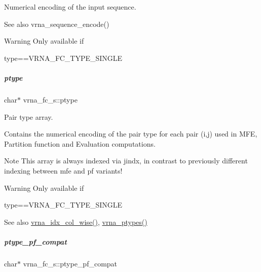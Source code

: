 Numerical encoding of the input sequence. 

\begin{DoxySeeAlso}{See also}
vrna\+\_\+sequence\+\_\+encode() 
\end{DoxySeeAlso}
\begin{DoxyWarning}{Warning}
Only available if\begin{DoxyVerb}type==VRNA_FC_TYPE_SINGLE \end{DoxyVerb}
 
\end{DoxyWarning}
\mbox{\label{group__fold__compound_a3fbea559f1d1976b2d67c215cdeee0b2}} 
\subparagraph{\texorpdfstring{ptype}{ptype}}
{\footnotesize\ttfamily char$\ast$ vrna\+\_\+fc\+\_\+s\+::ptype}



Pair type array. 

Contains the numerical encoding of the pair type for each pair (i,j) used in M\+FE, Partition function and Evaluation computations. \begin{DoxyNote}{Note}
This array is always indexed via jindx, in contrast to previously different indexing between mfe and pf variants! 
\end{DoxyNote}
\begin{DoxyWarning}{Warning}
Only available if\begin{DoxyVerb}type==VRNA_FC_TYPE_SINGLE \end{DoxyVerb}
 
\end{DoxyWarning}
\begin{DoxySeeAlso}{See also}
\hyperlink{group__utils_ga89ebc69c52fa0c78c9e1974b0017746b}{vrna\+\_\+idx\+\_\+col\+\_\+wise()}, \hyperlink{group__utils_ga51a9e86a5f731f5f2f5584ee67cee4a8}{vrna\+\_\+ptypes()} 
\end{DoxySeeAlso}
\mbox{\label{group__fold__compound_a7fe1235ce3d41287695f1ae1e283e8fc}} 
\subparagraph{\texorpdfstring{ptype\+\_\+pf\+\_\+compat}{ptype\_pf\_compat}}
{\footnotesize\ttfamily char$\ast$ vrna\+\_\+fc\+\_\+s\+::ptype\+\_\+pf\+\_\+compat}



